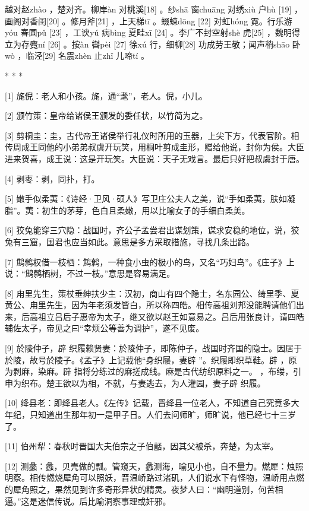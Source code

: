 \documentclass[12pt,UTF8]{ctexbook}
\begin{document}
越对赵zhào ，楚对齐。柳岸àn 对桃溪[18] 。纱shā 窗chuāng 对绣xiù 户hù [19] ，画阁对香闺[20] 。修月斧[21] ，上天梯tī 。蝃蝀dōng [22] 对虹hóng 霓。行乐游yóu 春圃pǔ [23] ，工谀yú 病bìng 夏畦xī [24] 。李广不封空射shè 虎[25] ，魏明得立为存麑ní [26] 。按àn 辔pèi [27] 徐xú 行，细柳[28] 功成劳王敬；闻声稍shāo 卧wò ，临泾[29] 名震zhèn 止zhǐ 儿啼tí 。



* * *



[1] 旄倪：老人和小孩。旄，通“耄”，老人。倪，小儿。

[2] 颁竹策：皇帝给诸侯王颁发的委任状，以竹简为之。

[3] 剪桐圭：圭，古代帝王诸侯举行礼仪时所用的玉器，上尖下方，代表官阶。相传周成王同他的小弟弟叔虞开玩笑，用桐叶剪成圭形，赠给他说，封你为侯。大臣进来贺喜，成王说：这是开玩笑。大臣说：天子无戏言。最后只好把叔虞封于唐。

[4] 剥枣：剥，同扑，打。

[5] 嫩手似柔荑：《诗经·卫风·硕人》写卫庄公夫人之美，说“手如柔荑，肤如凝脂”。荑：初生的茅芽，色白且柔嫩，用以比喻女子的手细白柔美。

[6] 狡兔能穿三穴隐：战国时，齐公子孟尝君出谋划策，谋求安稳的地位，说，狡兔有三窟，国君也应当如此。意思是多方采取措施，寻找几条出路。

[7] 鹪鹩权借一枝栖：鹪鹩，一种食小虫的极小的鸟，又名“巧妇鸟”。《庄子》上说：“鹪鹩栖树，不过一枝。”意思是容易满足。

[8] 甪里先生，策杖垂绅扶少主：汉初，商山有四个隐士，名东园公、绮里季、夏黄公、甪里先生，因为年老须发皆白，所以称四皓。相传高祖刘邦没能聘请他们出来，后高祖立吕后子惠帝为太子，继又欲以赵王如意易之。吕后用张良计，请四皓辅佐太子，帝见之曰“幸烦公等善为调护”，遂不见废。

[9] 於陵仲子，辟 织履赖贤妻：於陵仲子，即陈仲子，战国时齐国的隐士。因居于於陵，故号於陵子。《孟子》上记载他“身织屦，妻辟 ”。织屦即织草鞋。辟 ，原为剥麻，染麻。辟 指将分练过的麻搓成线。麻是古代纺织原料之一。 ，布缕，引申为织布。楚王欲以为相，不就，与妻逃去，为人灌园，妻子辟 织履。

[10] 绛县老：即绛县老人。《左传》记载，晋绛县一位老人，不知道自己究竟多大年纪，只知道出生那年初一是甲子日。人们去问师旷，师旷说，他已经七十三岁了。

[11] 伯州犁：春秋时晋国大夫伯宗之子伯嚭，因其父被杀，奔楚，为太宰。

[12] 测蠡：蠡，贝壳做的瓢。管窥天，蠡测海，喻见小也，自不量力。燃犀：烛照明察。相传燃烧犀角可以照妖，晋温峤路过渚矶，人们说水下有怪物，温峤用点燃的犀角照之，果然见到许多奇形异状的精灵。夜梦人曰：“幽明道别，何苦相逼。”这是迷信传说。后比喻洞察事理或奸邪。
\end{document}
